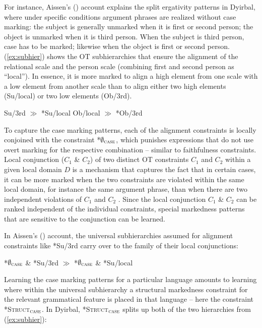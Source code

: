 \documentclass[output=paper,hidelinks]{langscibook}
\begin{document}
For instance, Aissen's (\citeyear{Aissen1999}) account explains the split ergativity patterns in Dyirbal, %
where under specific conditions argument phrases are realized without case marking: the subject is generally unmarked when it is first or second person; the object is unmarked when it is third person. When the subject is third person, case has to be marked; likewise when the object is first or second person. (\ref{ex:subhier}) shows the OT subhierarchies that ensure the alignment of the relational scale and the person scale (combining first and second person as ``local''). In essence, it is more marked to align a high element from one scale with a low element from another scale than to align either two high elements (Su/local) or two low elements (Ob/3rd).

\ea\label{ex:subhier}
 \ea *Su/3rd $\gg$ *Su/local
 \ex *Ob/local $\gg$ *Ob/3rd
 \z
\z

\indent
To capture the case marking patterns, each of the alignment constraints is locally conjoined with the constraint *$\emptyset_\textsc{case}$, which punishes expressions that do not use overt marking for the respective combination -- similar to faithfulness constraints. Local conjunction ($C_1$ \& $C_2$) of two distinct OT constraints $C_1$ and $C_2$ within a given local domain $D$ is a mechanism that captures the fact that in certain cases, it can be more marked when the two constraints are violated within the same local domain, for instance the same argument phrase, than when there are two independent violations of $C_1$ and $C_2$ \citep{Smolensky1995}. Since the local conjunction $C_1$ \& $C_2$ can be ranked independent of the individual constraints, special markedness patterns that are sensitive to the conjunction can be learned.

In Aissen's (\citeyear{Aissen1999}) account, the universal subhierarchies assumed for alignment constraints like *Su/3rd carry over to the family of their local conjunctions:

\ea
*$\emptyset_\textsc{case}$ \& *Su/3rd $\gg$ *$\emptyset_\textsc{case}$ \& *Su/local
\z

\noindent
Learning the case marking patterns for a particular language amounts to learning where within the universal subhierarchy a structural markedness constraint for the relevant grammatical feature is placed in that language -- here the constraint *\textsc{Struct}$_\textsc{case}$.
In Dyirbal, *\textsc{Struct}$_\textsc{case}$ splits up both of the two hierarchies from (\ref{ex:subhier}):
\end{document}
